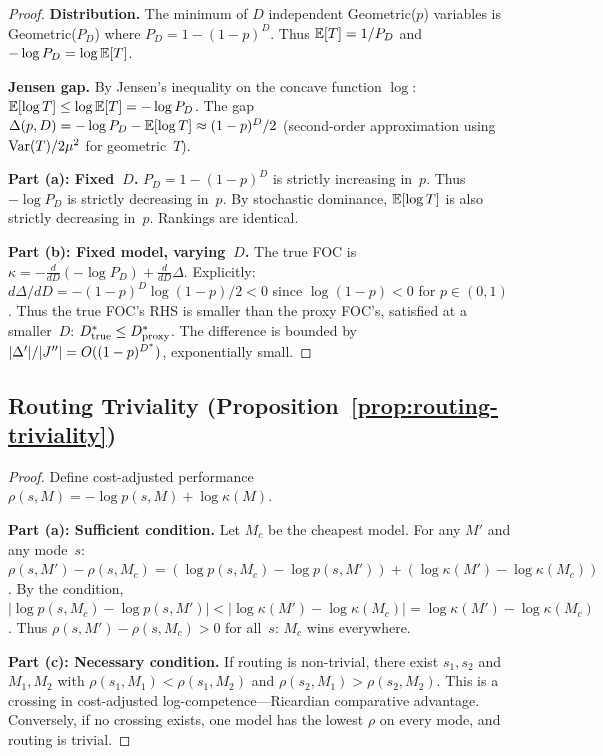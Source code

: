 \begin{proof}
\noindent\textbf{Distribution.}
The minimum of $D$ independent Geometric($p$) variables is Geometric($P_D$) where $P_D = 1-(1-p)^D$.
Thus $\mathbb{E}[T] = 1/P_D$ and $-\log P_D = \log \mathbb{E}[T]$.

\noindent\textbf{Jensen gap.}
By Jensen's inequality on the concave function $\log$:
$\mathbb{E}[\log T] \le \log \mathbb{E}[T] = -\log P_D$.
The gap $\Delta(p,D) = -\log P_D - \mathbb{E}[\log T] \approx (1-p)^D/2$ (second-order approximation using $\mathrm{Var}(T)/2\mu^2$ for geometric~$T$).

\noindent\textbf{Part (a): Fixed~$D$.}
$P_D = 1-(1-p)^D$ is strictly increasing in~$p$.
Thus $-\log P_D$ is strictly decreasing in~$p$.
By stochastic dominance, $\mathbb{E}[\log T]$ is also strictly decreasing in~$p$.
Rankings are identical.

\noindent\textbf{Part (b): Fixed model, varying~$D$.}
The true FOC is $\kappa = -\frac{d}{dD}(-\log P_D) + \frac{d}{dD}\Delta$.
Explicitly: $d\Delta/dD = -(1-p)^D \log(1-p)/2 < 0$ since $\log(1-p) < 0$ for $p \in (0,1)$.
Thus the true FOC's RHS is smaller than the proxy FOC's, satisfied at a smaller~$D$:
$D^*_{\mathrm{true}} \le D^*_{\mathrm{proxy}}$.
The difference is bounded by $|\Delta'|/|J''| = O((1-p)^{D^*})$, exponentially small.
\end{proof}

\subsection{Routing Triviality (Proposition~\ref{prop:routing-triviality})}
\label{app:routing}

\begin{proof}
Define cost-adjusted performance $\rho(s,M) = -\log p(s,M) + \log\kappa(M)$.

\noindent\textbf{Part (a): Sufficient condition.}
Let $M_c$ be the cheapest model.
For any $M'$ and any mode~$s$:
$\rho(s,M') - \rho(s,M_c) = (\log p(s,M_c) - \log p(s,M')) + (\log\kappa(M') - \log\kappa(M_c))$.
By the condition, $|\log p(s,M_c) - \log p(s,M')| < |\log\kappa(M') - \log\kappa(M_c)| = \log\kappa(M') - \log\kappa(M_c)$.
Thus $\rho(s,M') - \rho(s,M_c) > 0$ for all~$s$: $M_c$ wins everywhere.

\noindent\textbf{Part (c): Necessary condition.}
If routing is non-trivial, there exist $s_1, s_2$ and $M_1, M_2$ with $\rho(s_1,M_1) < \rho(s_1,M_2)$ and $\rho(s_2,M_1) > \rho(s_2,M_2)$.
This is a crossing in cost-adjusted log-competence---Ricardian comparative advantage.
Conversely, if no crossing exists, one model has the lowest $\rho$ on every mode, and routing is trivial.
\end{proof}
